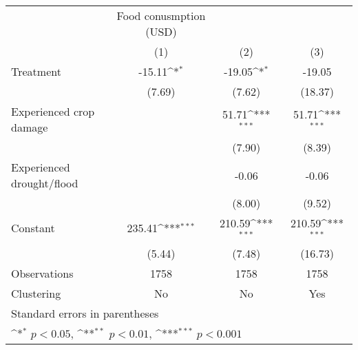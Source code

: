 {
\def\sym#1{\ifmmode^{#1}\else\(^{#1}\)\fi}
\begin{tabular}{l*{3}{c}}
\hline\hline
                    &Food conusmption (USD)                                           \\
                    &\multicolumn{1}{c}{(1)}         &\multicolumn{1}{c}{(2)}         &\multicolumn{1}{c}{(3)}         \\
\hline
Treatment           &      -15.11\sym{*}  &      -19.05\sym{*}  &      -19.05         \\
                    &      (7.69)         &      (7.62)         &     (18.37)         \\
[1em]
Experienced crop damage&                     &       51.71\sym{***}&       51.71\sym{***}\\
                    &                     &      (7.90)         &      (8.39)         \\
[1em]
Experienced drought/flood&                     &       -0.06         &       -0.06         \\
                    &                     &      (8.00)         &      (9.52)         \\
[1em]
Constant            &      235.41\sym{***}&      210.59\sym{***}&      210.59\sym{***}\\
                    &      (5.44)         &      (7.48)         &     (16.73)         \\
\hline
Observations        &        1758         &        1758         &        1758         \\
Clustering          &          No         &          No         &         Yes         \\
\hline\hline
\multicolumn{4}{l}{\footnotesize Standard errors in parentheses}\\
\multicolumn{4}{l}{\footnotesize \sym{*} \(p<0.05\), \sym{**} \(p<0.01\), \sym{***} \(p<0.001\)}\\
\end{tabular}
}
